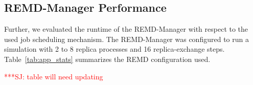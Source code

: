 \documentclass{rspublic}
\newcommand{\jhanote}[1]{ {\textcolor{red} { ***SJ: #1 }}}
\newcommand{\jhanote}[1]{}
\begin{document}

\subsection{REMD-Manager Performance}        

Further, we evaluated the runtime of the REMD-Manager with respect to the 
used job scheduling mechanism. The REMD-Manager was configured to run 
a simulation with 2 to 8 replica processes and 16 replica-exchange steps. 
Table~\ref{tab:app_stats} summarizes the REMD configuration used. 


\jhanote{table will need updating}
\end{document}
